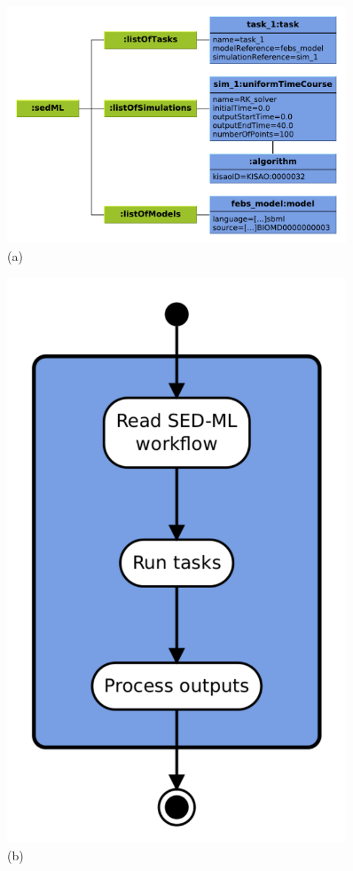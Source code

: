\documentclass[17pt,portrait,a1,usenames,dvipsnames,plainboxedsections]{sciposter}
\begin{document}
\begin{multicols}{2}
\begin{figure}
\begin{minipage}[c]{0.7\textwidth}
\centering
\includegraphics[width=0.9\textwidth]{workflow_instance.pdf}\\(a)
\end{minipage}\hfill
\begin{minipage}[c]{0.3\textwidth}
\centering
\includegraphics[width=0.9\textwidth]{activity.pdf}\\(b)

\end{minipage}
\end{figure}
\end{multicols}
\end{document}
